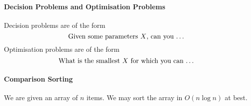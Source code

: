 \paragraph{Decision Problems and Optimisation Problems}
Decision problems are of the form
\[\text{Given some parameters \(X\), can you \dots}\]
Optimisation problems are of the form
\[\text{What is the smallest \(X\) for which you can \dots}\]

\paragraph{Comparison Sorting}
We are given an array of \(n\) items. We may sort the array in \(O(n\log n)\)
at best.

